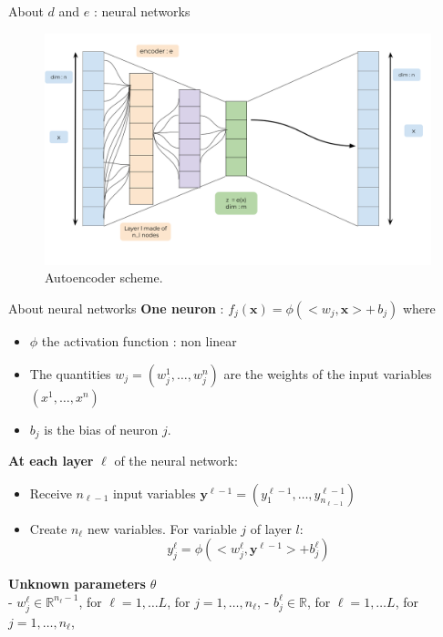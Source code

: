 \documentclass[
  ignorenonframetext,
]{beamer}
\begin{document}
\begin{frame}{About \(d\) and \(e\) : neural networks}
\protect\hypertarget{about-d-and-e-neural-networks}{}
\begin{figure}

{\centering \includegraphics[width=0.9\linewidth]{images/Autoencoder2} 

}

\caption{Autoencoder scheme.}\label{fig:unnamed-chunk-4}
\end{figure}
\end{frame}

\begin{frame}{About neural networks}
\protect\hypertarget{about-neural-networks}{}
\textbf{One neuron} :
\(f_j (\mathbf{x}) = \phi (<w_j, \mathbf {x}> + \, b_j)\) where

\begin{itemize}
\item
  \(\phi\) the activation function : non linear
\item
  The quantities \(w_j = (w_j^1, \dots, w_j^n)\) are the weights of the
  input variables \((x^1, \dots, x^n)\)
\item
  \(b_j\) is the bias of neuron \(j\).
\end{itemize}

\textbf{At each layer} \(\ell\) of the neural network:

\begin{itemize}
\item
  Receive \(n_{\ell-1}\) input variables
  \(\mathbf{y}^{\ell-1} =(y^{\ell-1}_{1}, \dots,y^{\ell-1}_{n_{\ell-1}})\)
\item
  Create \(n_\ell\) new variables. For variable \(j\) of layer \(l\):
  \[y^{\ell}_{j} = \phi(<w^\ell_j, \mathbf{y}^{\ell-1}>  +  b^{\ell}_j)\]
\end{itemize}

\textbf{Unknown parameters} \(\theta\)\\
- \(w^\ell_j \in \mathbb{R}^{n_\ell-1}\), for \(\ell =1, \dots L\), for
\(j=1,\dots,n_{\ell}\), - \(b^\ell_j \in \mathbb{R}\), for
\(\ell =1, \dots L\), for \(j=1,\dots,n_{\ell}\),
\end{frame}
\end{document}
